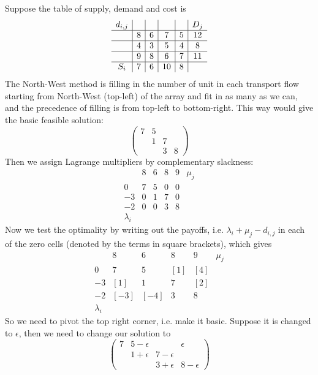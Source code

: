 \begin{example}
    Suppose the table of supply, demand and cost is
    $$\begin{array}{c|c|c|c|c|c}
        d_{i,j}&&&&&D_j\\
        \hline
        &8&6&7&5&12\\ \hline
        &4&3&5&4&8\\ \hline
        &9&8&6&7&11\\ \hline
        S_i&7&6&10&8&
    \end{array}$$
    The North-West method is filling in the number of unit in each transport flow starting from North-West (top-left) of the array and fit in as many as we can, and the precedence of filling is from top-left to bottom-right.
    This way would give the basic feasible solution:
    $$\begin{pmatrix}
        7&5&&\\
        &1&7&\\
        &&3&8
    \end{pmatrix}$$
    Then we assign Lagrange multipliers by complementary slackness:
    $$\begin{array}{c|cccc|c}
        &8&6&8&9&\mu_j\\ \hline
        0&7&5&0&0&\\
        -3&0&1&7&0&\\
        -2&0&0&3&8&\\ \hline
        \lambda_i&&&&&
    \end{array}$$
    Now we test the optimality by writing out the payoffs, i.e. $\lambda_i+\mu_j-d_{i,j}$ in each of the zero cells (denoted by the terms in square brackets), which gives
    $$\begin{array}{c|cccc|c}
        &8&6&8&9&\mu_j\\ \hline
        0&7&5&[1]&[4]&\\
        -3&[1]&1&7&[2]&\\
        -2&[-3]&[-4]&3&8&\\ \hline
        \lambda_i&&&&&
    \end{array}$$
    So we need to pivot the top right corner, i.e. make it basic.
    Suppose it is changed to $\epsilon$, then we need to change our solution to
    $$\begin{pmatrix}
        7&5-\epsilon&&\epsilon\\
        &1+\epsilon&7-\epsilon&\\
        &&3+\epsilon&8-\epsilon
    \end{pmatrix}$$

\end{example}
